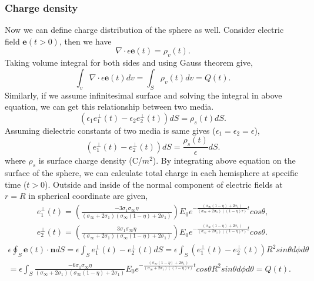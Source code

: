 \documentclass[a4paper, 11pt]{article}
\begin{document}
\subsubsection{Charge density}

Now we can define charge distribution of the sphere as well. Consider electric field $\mathbf{e}(t>0)$, then we have
\begin{equation*}
	\nabla\cdot\epsilon\mathbf{e}(t)=\rho_v (t).
\end{equation*}
Taking volume integral for both sides and using Gauss theorem give, 
\begin{equation*}
	\int_{v}^{}	\nabla\cdot\epsilon\mathbf{e}(t) dv=	\int_{S}^{}	\rho_v(t) dv = Q(t).
\end{equation*}
Similarly, if we assume infinitesimal surface and solving the integral in above equation, we can get this relationship between two media. 
\begin{equation*}
	(\epsilon_1 e_{1}^{\perp}(t)-\epsilon_2 e_{2}^{\perp}(t)) dS = \rho_s (t) dS.
\end{equation*}
Assuming dielectric constants of two media is same gives ($\epsilon_1=\epsilon_2=\epsilon$), 
\begin{equation}
	(e_{1}^{\perp}(t)-e_{2}^{\perp}(t)) dS = \frac{\rho_s (t)}{\epsilon} dS.
\end{equation}
where $\rho_s$ is surface charge density (C/$m^2$). 
By integrating above equation on the surface of the sphere, we can calculate total charge in each hemisphere at specific time ($t>0$). Outside and inside of the normal component of electric fields at $r=R$ in spherical coordinate are given,
\begin{align*}
    e_{1}^{\perp}(t)=(\frac{-3\sigma_1\sigma_{\infty}\eta}{(\sigma_{\infty}+2\sigma_1)(\sigma_{\infty}(1-\eta)+2\sigma_1)})E_0e^{-\frac{(\sigma_{\infty}(1-\eta)+2\sigma_1)}{(\sigma_{\infty} + 2\sigma_1)((1-\eta)\tau)}t}cos\theta, \\
	e_{2}^{\perp}(t)=(\frac{3\sigma_1\sigma_{\infty}\eta}{(\sigma_{\infty}+2\sigma_1)(\sigma_{\infty}(1-\eta)+2\sigma_1)})
	                  E_0e^{-\frac{(\sigma_{\infty}(1-\eta)+2\sigma_1)}{(\sigma_{\infty} + 2\sigma_1)((1-\eta)\tau)}t}cos\theta.
\end{align*}
\begin{eqnarray*}
\epsilon\oint_{S}^{} \mathbf{e}(t)\cdot\hat{\mathbf{n}} dS=\epsilon\int_{S}^{} e_{1}^{\perp}(t)-e_{2}^{\perp}(t) dS
 =\epsilon\int_{S}^{} (e_{1}^{\perp}(t)-e_{2}^{\perp}(t)) R^2 sin\theta d\phi d\theta\\ \nonumber
 =\epsilon\int_{S}^{}  \frac{-6\sigma_1\sigma_{\infty}\eta}{(\sigma_{\infty}+2\sigma_1)(\sigma_{\infty}(1-\eta)+2\sigma_1)}
	                  E_0e^{-\frac{(\sigma_{\infty}(1-\eta)+2\sigma_1)}{(\sigma_{\infty} + 2\sigma_1)((1-\eta)\tau)}t}cos\theta R^2 sin\theta d\phi d\theta=Q(t).
\end{eqnarray*}
\end{document}
